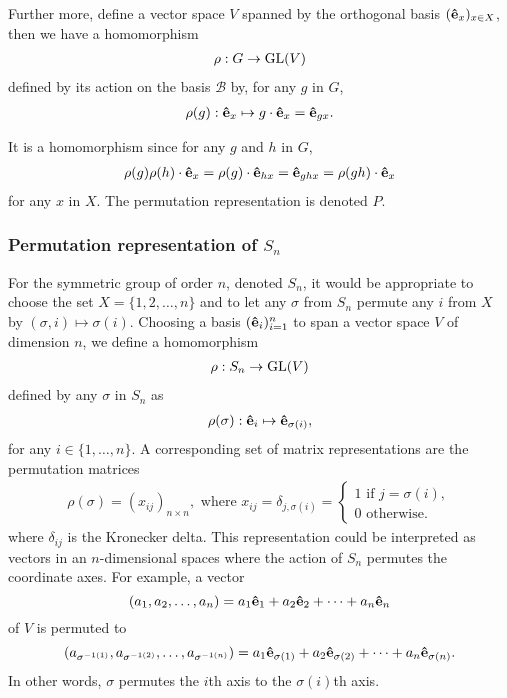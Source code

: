 	Further more, define a vector space $V$ spanned by the orthogonal basis $(\mathbf{\hat{e}}_x)_{x \in X}$, then we have a homomorphism
	\begin{align}
		\rho: G \rightarrow \text{GL}(V)
	\end{align}
	defined by its action on the basis $\mathcal{B}$ by, for any $g$ in $G$,
	\begin{align}
		\rho(g): \mathbf{\hat{e}}_x \mapsto g \cdot \mathbf{\hat{e}}_x = \mathbf{\hat{e}}_{gx}.
	\end{align}
	
	It is a homomorphism since for any $g$ and $h$ in $G$,
	\begin{align}
		\rho(g) \rho(h) \cdot \mathbf{\hat{e}}_x = \rho(g) \cdot \mathbf{\hat{e}}_{hx} = \mathbf{\hat{e}}_{ghx} = \rho(gh) \cdot \mathbf{\hat{e}}_x
	\end{align}
	for any $x$ in $X$. The permutation representation is denoted $P$. %
	
	
	\subsubsection{Permutation representation of $S_n$}
	For the symmetric group of order $n$, denoted $S_n$, it would be appropriate to choose the set $X = \{1,2, \dots, n\}$ and to let any $\sigma$ from $S_n$ permute any $i$ from $X$ by $(\sigma,i) \mapsto \sigma(i)$. Choosing a basis $(\mathbf{\hat{e}}_i)_{i=1}^n$ to span a vector space $V$ of dimension $n$, we define a homomorphism 
	\begin{align}
		\rho: S_n \rightarrow \text{GL}(V)
	\end{align}
	defined by any $\sigma$ in $S_n$ as
	\begin{align}
		\rho(\sigma): \mathbf{\hat{e}}_i \mapsto \mathbf{\hat{e}}_{\sigma(i)},
	\end{align}
	for any $i \in \{1,\dots, n\}$. A corresponding set of matrix representations are the permutation matrices
	\begin{align}
		\rho(\sigma) = (x_{ij})_{n \times n}, \text{ where } x_{ij} = \delta_{j,\sigma(i)} = \begin{cases}
			1 \text{ if } j = \sigma(i),\\
			0 \text{ otherwise.}
		\end{cases}
	\end{align}
	where $\delta_{ij}$ is the Kronecker delta.	This representation could be interpreted as vectors in an $n$-dimensional spaces where the action of $S_n$ permutes the coordinate axes. For example, a vector 
	\[
		(a_1, a_2, \dots, a_n) = a_1 \mathbf{\hat{e}}_1 + a_2 \mathbf{\hat{e}}_2 + \dots + a_n \mathbf{\hat{e}}_n
	\]
	of $V$ is permuted to 
	\[
		(a_{\sigma^{-1(1)}}, a_{\sigma^{-1(2)}}, \dots, a_{\sigma^{-1(n)}}) = a_1 \mathbf{\hat{e}}_{\sigma(1)} + a_2 \mathbf{\hat{e}}_{\sigma(2)} + \dots + a_n \mathbf{\hat{e}}_{\sigma(n)}.
	\]
	In other words, $\sigma$ permutes the $i$th axis to the $\sigma(i)$th axis.
	
